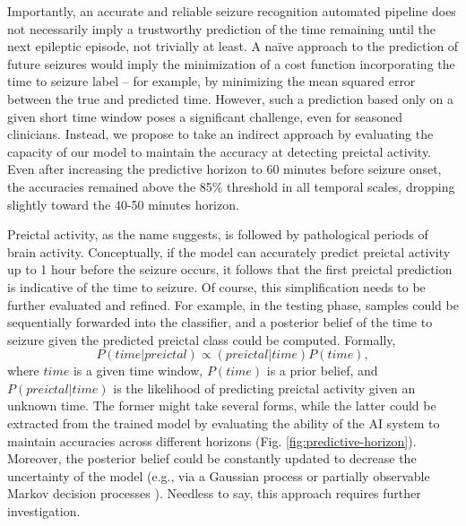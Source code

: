 \documentclass[a4paper,fleqn]{cas-sc}
\begin{document}
Importantly, an accurate and reliable seizure recognition automated pipeline does not necessarily imply a trustworthy prediction of the time remaining until the next epileptic episode, not trivially at least. A naïve approach to the prediction of future seizures would imply the minimization of a cost function incorporating the time to seizure label – for example, by minimizing the mean squared error between the true and predicted time. However, such a prediction based only on a given short time window poses a significant challenge, even for seasoned clinicians. Instead, we propose to take an indirect approach by evaluating the capacity of our model to maintain the accuracy at detecting preictal activity. Even after increasing the predictive horizon to 60 minutes before seizure onset, the accuracies remained above the 85\% threshold in all temporal scales, dropping slightly toward the 40-50 minutes horizon.  

Preictal activity, as the name suggests, is followed by pathological periods of brain activity. Conceptually, if the model can accurately predict preictal activity up to 1 hour before the seizure occurs, it follows that the first preictal prediction is indicative of the time to seizure. Of course, this simplification needs to be further evaluated and refined. For example, in the testing phase, samples could be sequentially forwarded into the classifier, and a posterior belief of the time to seizure given the predicted preictal class could be computed. Formally,
\begin{equation*}
    P(time|preictal) \propto (preictal|time)P(time), 
\end{equation*}
where $time$ is a given time window, $P(time)$ is a prior belief, and $P(preictal|time)$
is the likelihood of predicting preictal activity given an unknown time. The former might take several forms, while the latter could be extracted from the trained model by evaluating the ability of the AI system to maintain accuracies across different horizons (Fig. \ref{fig:predictive-horizon}). Moreover, the posterior belief could be constantly updated to decrease the uncertainty of the model (e.g., via a Gaussian process or partially observable Markov decision processes \cite{kaelbling1998planning}). Needless to say, this approach requires further investigation.
\end{document}
